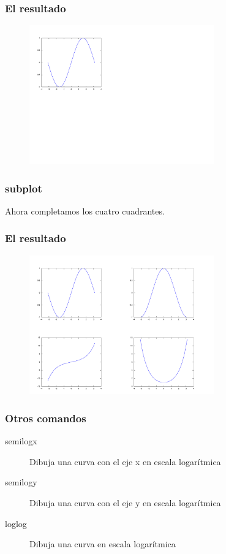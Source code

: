 \documentclass[12pt]{beamer}
\begin{document}
\begin{frame}
\frametitle{El resultado}
  \begin{figure}[h]
    \centering{}
    \includegraphics[width=8cm, keepaspectratio]{fig/subplot1.pdf}
  \end{figure}
\end{frame}



\begin{frame}
\frametitle{subplot}
Ahora completamos los cuatro cuadrantes.
\testcode
\end{frame}

\begin{frame}
\frametitle{El resultado}
  \begin{figure}[h]
    \centering{}
    \includegraphics[width=8cm, keepaspectratio]{fig/subplot2.pdf}
  \end{figure}
\end{frame}

\begin{frame}
\frametitle{Otros comandos}
\begin{description}
\item[semilogx] Dibuja una curva con el eje x en escala logarítmica
\item[semilogy] Dibuja una curva con el eje y en escala logarítmica
\item[loglog] Dibuja una curva en escala logarítmica
\end{description}
\end{frame}
\end{document}
